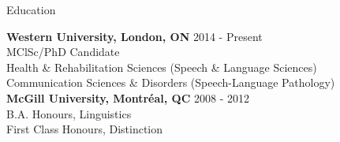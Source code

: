 \documentclass{resume} %
\begin{document}

\begin{rSection}{Education}

{\bf Western University, London, ON} \hfill {2014 - Present} \\ 
MClSc/PhD Candidate\\
Health \& Rehabilitation Sciences (Speech \& Language Sciences) \\ 
Communication Sciences \& Disorders (Speech-Language Pathology) \bigskip \\
{\bf McGill University, Montr\'eal, QC} \hfill {2008 - 2012} \\
B.A. Honours, Linguistics \\
First Class Honours, Distinction

\end{rSection}

\end{document}
